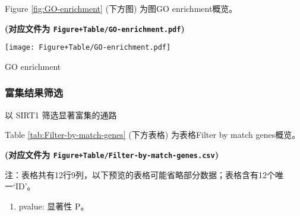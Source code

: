 \documentclass[
]{article}
\providecommand{\tightlist}{%
  \setlength{\itemsep}{0pt}\setlength{\parskip}{0pt}}
\begin{document}
Figure \ref{fig:GO-enrichment} (下方图) 为图GO enrichment概览。

\textbf{(对应文件为 \texttt{Figure+Table/GO-enrichment.pdf})}

\def\@captype{figure}
\begin{center}
\texttt{[image: Figure+Table/GO-enrichment.pdf]}
\caption{GO enrichment}\label{fig:GO-enrichment}
\end{center}

\hypertarget{ux5bccux96c6ux7ed3ux679cux7b5bux9009}{%
\subsubsection{富集结果筛选}\label{ux5bccux96c6ux7ed3ux679cux7b5bux9009}}

以 SIRT1 筛选显著富集的通路

Table \ref{tab:Filter-by-match-genes} (下方表格) 为表格Filter by match genes概览。

\textbf{(对应文件为 \texttt{Figure+Table/Filter-by-match-genes.csv})}

\begin{center}\begin{tcolorbox}[colback=gray!10, colframe=gray!50, width=0.9\linewidth, arc=1mm, boxrule=0.5pt]注：表格共有12行9列，以下预览的表格可能省略部分数据；表格含有12个唯一`ID'。
\end{tcolorbox}
\end{center}
\begin{center}\begin{tcolorbox}[colback=gray!10, colframe=gray!50, width=0.9\linewidth, arc=1mm, boxrule=0.5pt]\begin{enumerate}\tightlist
\item pvalue:  显著性 P。
\end{enumerate}\end{tcolorbox}
\end{center}
\end{document}
